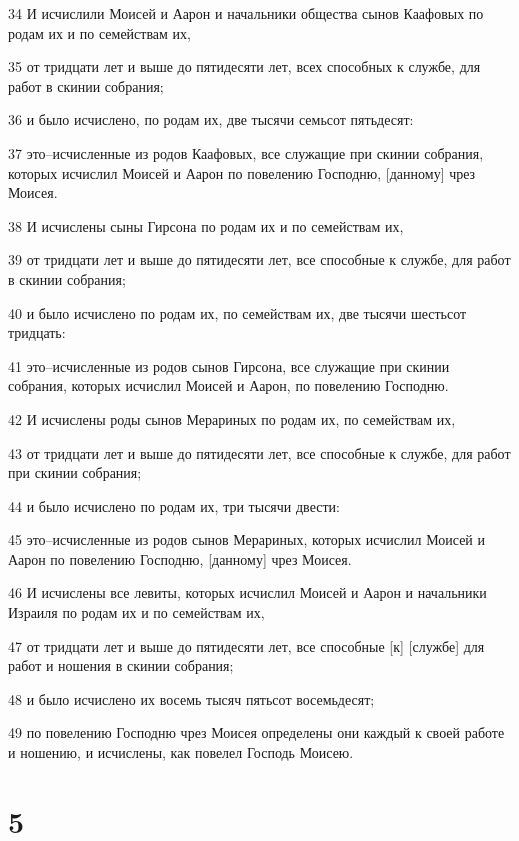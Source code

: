 \par 34 И исчислили Моисей и Аарон и начальники общества сынов Каафовых по родам их и по семействам их,
\par 35 от тридцати лет и выше до пятидесяти лет, всех способных к службе, для работ в скинии собрания;
\par 36 и было исчислено, по родам их, две тысячи семьсот пятьдесят:
\par 37 это--исчисленные из родов Каафовых, все служащие при скинии собрания, которых исчислил Моисей и Аарон по повелению Господню, [данному] чрез Моисея.
\par 38 И исчислены сыны Гирсона по родам их и по семействам их,
\par 39 от тридцати лет и выше до пятидесяти лет, все способные к службе, для работ в скинии собрания;
\par 40 и было исчислено по родам их, по семействам их, две тысячи шестьсот тридцать:
\par 41 это--исчисленные из родов сынов Гирсона, все служащие при скинии собрания, которых исчислил Моисей и Аарон, по повелению Господню.
\par 42 И исчислены роды сынов Мерариных по родам их, по семействам их,
\par 43 от тридцати лет и выше до пятидесяти лет, все способные к службе, для работ при скинии собрания;
\par 44 и было исчислено по родам их, три тысячи двести:
\par 45 это--исчисленные из родов сынов Мерариных, которых исчислил Моисей и Аарон по повелению Господню, [данному] чрез Моисея.
\par 46 И исчислены все левиты, которых исчислил Моисей и Аарон и начальники Израиля по родам их и по семействам их,
\par 47 от тридцати лет и выше до пятидесяти лет, все способные [к] [службе] для работ и ношения в скинии собрания;
\par 48 и было исчислено их восемь тысяч пятьсот восемьдесят;
\par 49 по повелению Господню чрез Моисея определены они каждый к своей работе и ношению, и исчислены, как повелел Господь Моисею.

\chapter{5}

